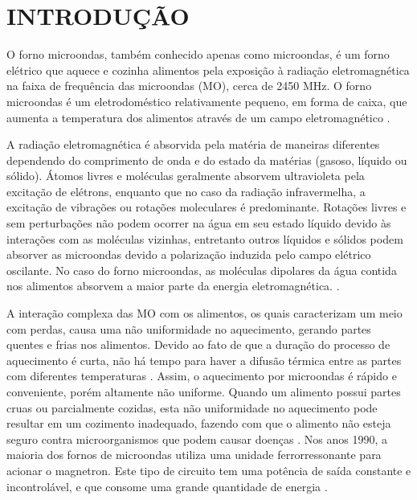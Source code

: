 \setcounter{page}{13}

\chapter{INTRODUÇÃO}
\label{chap:introducao}


O forno microondas, também conhecido apenas como microondas, é um forno elétrico que aquece e cozinha alimentos pela exposição à radiação eletromagnética na faixa de frequência das microondas (MO), cerca de 2450 MHz. O forno microondas é um eletrodoméstico relativamente pequeno, em forma de caixa, que aumenta a temperatura dos alimentos através de um campo eletromagnético \cite{MicrowaveBritannica}. 

A radiação eletromagnética é absorvida pela matéria de maneiras diferentes dependendo do comprimento de onda e do estado da matérias (gasoso, líquido ou sólido). Átomos livres e moléculas geralmente absorvem ultravioleta pela excitação de elétrons, enquanto que no caso da radiação infravermelha, a excitação de vibrações ou rotações moleculares é predominante. Rotações livres e sem perturbações não podem ocorrer na água em seu estado líquido devido às interações com as moléculas vizinhas,  entretanto outros líquidos e sólidos podem absorver as microondas devido a polarização induzida pelo campo elétrico oscilante. No caso do forno microondas, as moléculas dipolares da água contida nos alimentos absorvem a maior parte da energia eletromagnética. \cite{Vollmer}.

A interação complexa das MO com os alimentos, os quais caracterizam um meio com perdas, causa uma não uniformidade no aquecimento, gerando partes quentes e frias nos alimentos. Devido ao fato de que a duração do processo de aquecimento é curta, não há tempo para haver a difusão térmica entre as partes com diferentes temperaturas \cite{Ma}. Assim, o aquecimento por microondas é rápido e conveniente, porém altamente não uniforme. Quando um alimento possui partes cruas ou parcialmente cozidas, esta não uniformidade no aquecimento pode resultar em um cozimento inadequado, fazendo com que o alimento não esteja seguro contra microorganismos que podem causar doenças \cite{Pitchai2011}. Nos anos 1990, a maioria dos fornos de microondas utiliza uma unidade ferrorressonante para acionar o magnetron. Este tipo de circuito tem uma potência de saída constante e incontrolável, e que consome uma grande quantidade de energia \cite{Hidenori1991}.

